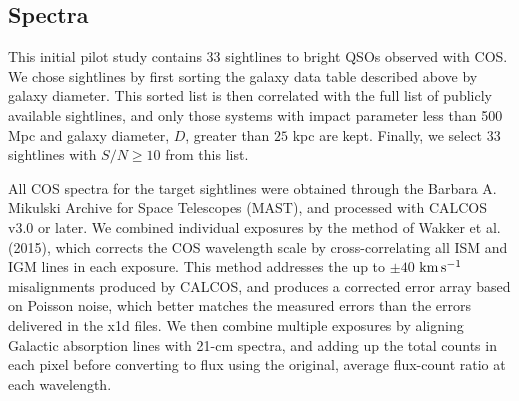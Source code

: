 \documentclass[twocolumn,tighten]{aastex6}
\begin{document}
\subsection{Spectra}

This initial pilot study contains 33 sightlines to bright QSOs observed with COS. We chose sightlines by first sorting the galaxy data table described above by galaxy diameter. This sorted list is then correlated with the full list of publicly available sightlines, and only those systems with impact parameter less than 500 Mpc and galaxy diameter, $D$, greater than $25$ kpc  are kept. Finally, we select 33 sightlines with $S/N \geq 10$ from this list.

All COS spectra for the target sightlines were obtained through the Barbara A. Mikulski Archive for Space Telescopes (MAST), and processed with CALCOS v3.0 or later. We combined individual exposures by the method of Wakker et al. (2015), which corrects the COS wavelength scale by cross-correlating all ISM and IGM lines in each exposure. This method addresses the up to $\pm40$ $\rm km\, s^{-1}$ misalignments produced by CALCOS, and produces a corrected error array based on Poisson noise, which better matches the measured errors than the errors delivered in the x1d files. We then combine multiple exposures by aligning Galactic absorption lines with 21-cm spectra, and adding up the total counts in each pixel before converting to flux using the original, average flux-count ratio at each wavelength.
\end{document}
